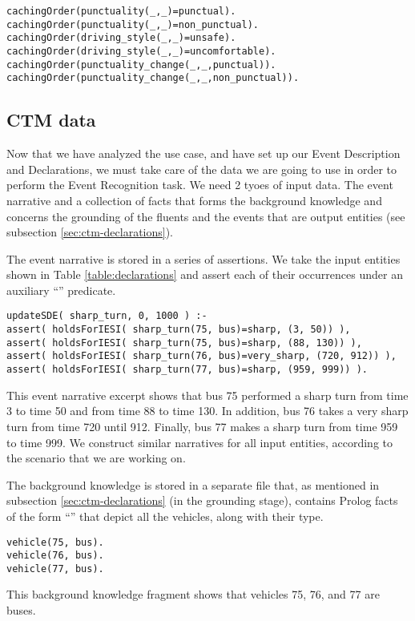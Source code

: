 %
\begin{verbatim}
cachingOrder(punctuality(_,_)=punctual).    
cachingOrder(punctuality(_,_)=non_punctual).
cachingOrder(driving_style(_,_)=unsafe). 
cachingOrder(driving_style(_,_)=uncomfortable).
cachingOrder(punctuality_change(_,_,punctual)).
cachingOrder(punctuality_change(_,_,non_punctual)).
\end{verbatim}

\subsection{CTM data}\label{sec:ctm-data}

Now that we have analyzed the use case, and have set up our Event Description and Declarations, we must take care of the data we are going to use in order to perform the Event Recognition task. We need 2 tyoes of input data. The event narrative and a collection of facts that forms the background knowledge and concerns the grounding of the fluents and the events that are output entities (see subsection \ref{sec:ctm-declarations}).

The event narrative is stored in a series of assertions. We take the input entities shown in Table \ref{table:declarations} and assert each of their occurrences under an auxiliary ``'' predicate.
%
\begin{verbatim}
updateSDE( sharp_turn, 0, 1000 ) :-
assert( holdsForIESI( sharp_turn(75, bus)=sharp, (3, 50)) ),
assert( holdsForIESI( sharp_turn(75, bus)=sharp, (88, 130)) ),
assert( holdsForIESI( sharp_turn(76, bus)=very_sharp, (720, 912)) ),
assert( holdsForIESI( sharp_turn(77, bus)=sharp, (959, 999)) ).
\end{verbatim}
%
This event narrative excerpt shows that bus 75 performed a sharp turn from time 3 to time 50 and from time 88 to time 130. In addition, bus 76 takes a very sharp turn from time 720 until 912. Finally, bus 77 makes a sharp turn from time 959 to time 999. We construct similar narratives for all input entities, according to the scenario that we are working on.

The background knowledge is stored in a separate file that, as mentioned in subsection \ref{sec:ctm-declarations} (in the grounding stage), contains Prolog facts of the form ``'' that depict all the vehicles, along with their type.
%
\begin{verbatim}
vehicle(75, bus).
vehicle(76, bus).
vehicle(77, bus).
\end{verbatim}
%
This background knowledge fragment shows that vehicles 75, 76, and 77 are buses.

